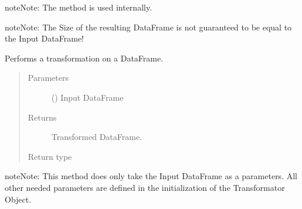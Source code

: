 \documentclass[a4paper,10pt, twoside,english]{sphinxmanual}
\begin{document}
\begin{fulllineitems}
\begin{quote}
\begin{description}
\end{description}\end{quote}

\begin{sphinxadmonition}{note}{Note:}
The  method is used internally.
\end{sphinxadmonition}

\begin{sphinxadmonition}{note}{Note:}
The Size of the resulting DataFrame is not guaranteed to be equal to the Input DataFrame!
\end{sphinxadmonition}

\begin{fulllineitems}
\label{\detokenize{transformer/sieve:spooq2.transformer.sieve.Sieve.transform}}
Performs a transformation on a DataFrame.
\begin{quote}\begin{description}
\item[{Parameters}] \leavevmode
{} () \textendash{} Input DataFrame

\item[{Returns}] \leavevmode
Transformed DataFrame.

\item[{Return type}] \leavevmode
{}

\end{description}\end{quote}

\begin{sphinxadmonition}{note}{Note:}
This method does only take the Input DataFrame as a parameters. All other needed parameters
are defined in the initialization of the Transformator Object.
\end{sphinxadmonition}

\end{fulllineitems}


\end{fulllineitems}
\end{document}
